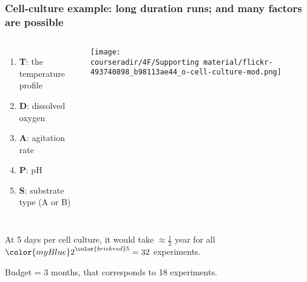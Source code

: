 \documentclass[11pt,aspectratio=169,mathserif]{beamer}
\begin{document}
\begin{frame}\frametitle{Cell-culture example: long duration runs; and many factors are possible}
	\newcommand{\white}{\color{white}}
	\begin{columns}[c]
			\begin{enumerate}
				\item	\textbf{T}: the temperature profile
				\item	\textbf{D}: dissolved oxygen
				\item	\textbf{A}: agitation rate
				\item	\textbf{P}: pH
				\item	\textbf{S}: substrate type (A or B)
			\end{enumerate}
		
			
			\vspace{0.2cm}
			
			\centerline{\texttt{[image: \\courseradir/4F/Supporting material/flickr-493740898\_b98113ae44\_o-cell-culture-mod.png]}}
	\end{columns}

	\vfill
	At 5 days per cell culture, it would take $\approx \tfrac{1}{2}$ year for all  ${\color{myBlue} 2}^{\color{brickred} 5} = 32$ experiments.
	
	Budget = 3 months, {\color{myOrange} that corresponds to 18 experiments}.
		
\end{frame}
\end{document}
